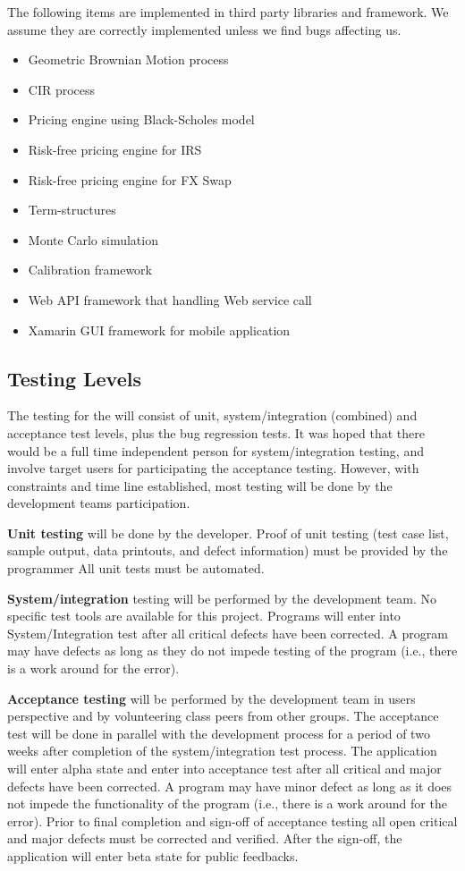 The following items are implemented in third party libraries and framework. We
assume they are correctly implemented unless we find bugs affecting us.
\begin{itemize}
  \item Geometric Brownian Motion process
  \item CIR process
  \item Pricing engine using Black-Scholes model
  \item Risk-free pricing engine for IRS
  \item Risk-free pricing engine for FX Swap
  \item Term-structures
  \item Monte Carlo simulation
  \item Calibration framework
  \item Web API framework that handling Web service call
  \item Xamarin GUI framework for mobile application
\end{itemize}

\subsection{Testing Levels}

The testing for the will consist of unit, system/integration (combined) and acceptance test levels, plus the bug regression tests. It was hoped that there would be a full time independent person for system/integration testing, and involve target users for participating the acceptance testing. However, with constraints and time line established,
most testing will be done by the development teams participation.

\textbf{Unit testing} will be done by the developer. Proof of unit testing (test case list, sample output, data printouts, and defect information) must be provided by the programmer
All unit tests must be automated. 

\textbf{System/integration} testing will be performed by the development team. No specific test tools are available for this project. Programs will enter into System/Integration test after all critical defects have been corrected. A program may have defects as long as they do not impede testing of the program (i.e., there is a work around for the error).

\textbf{Acceptance testing} will be performed by the development team in users perspective and by volunteering class peers from other groups. The acceptance test will be done in parallel with the development process for a period of two weeks after completion of the system/integration test process. The application will enter alpha state and enter into acceptance test after all critical and major defects have been corrected. A program may have minor defect as long as it does not impede the functionality of the program (i.e., there is a work around for the error). Prior to final completion and sign-off of acceptance testing all open critical and major defects must be corrected and verified. After the sign-off, the application will enter beta state for public feedbacks.

